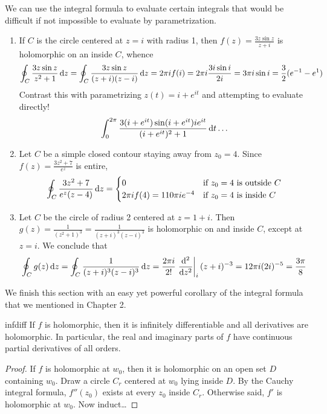 \begin{examples}{}{}
We can use the integral formula to evaluate certain integrals that would be difficult if not impossible to evaluate by parametrization.
\begin{enumerate}
  \item If $C$ is the circle centered at $z=i$ with radius 1, then $f(z)=\frac{3z\sin z}{z+i}$ is holomorphic on an inside $C$, whence
  \[\oint_C\frac{3z\sin z}{z^2+1}\,\dz =\oint_C\frac{3z\sin z}{(z+i)(z-i)}\,\dz =2\pi if(i)=2\pi i\frac{3i\sin i}{2i}=3\pi i\sin i =\frac 32(e^{-1}-e^1)\]
  Contrast this with parametrizing $z(t)=i+e^{it}$ and attempting to evaluate directly!
  \[\int_0^{2\pi}\frac{3(i+e^{it})\sin(i+e^{it})ie^{it}}{(i+e^{it})^2+1}\,\dt\ldots\]
  
  \item Let $C$ be a simple closed contour staying away from $z_0=4$. Since $f(z)=\frac{3z^2+7}{e^z}$ is entire,
  \[\oint_C\frac{3z^2+7}{e^z(z-4)}\,\dz=\begin{cases}
  0&\text{if $z_0=4$ is outside $C$}\\
  2\pi if(4)=110\pi ie^{-4}&\text{if $z_0=4$ is inside $C$}
  \end{cases}\]
  
  \item Let $C$ be the circle of radius 2 centered at $z=1+i$. Then $g(z)=\frac 1{(z^2+1)^3}=\frac 1{(z+i)^3(z-i)^3}$ is holomorphic on and inside $C$, except at $z=i$. We conclude that
  \[\oint_Cg(z)\,\dz=\oint_C\frac 1{(z+i)^3(z-i)^3}\,\dz=\frac{2\pi i}{2!}\diffat[^2]{z^2}{i}(z+i)^{-3} =12\pi i(2i)^{-5} =\frac{3\pi}{8}\]
\end{enumerate}
\end{examples}

We finish this section with an easy yet powerful corollary of the integral formula that we mentioned in Chapter 2.

\begin{cor}{}{infdiff}
If $f$ is holomorphic, then it is infinitely differentiable and all derivatives are holomorphic. In particular, the real and imaginary parts of $f$ have continuous partial derivatives of all orders.
\end{cor}


\begin{proof}
If $f$ is holomorphic at $w_0$, then it is holomorphic on an open set $D$ containing $w_0$. Draw a circle $C_r$ centered at $w_0$ lying inside $D$. By the Cauchy integral formula, $f''(z_0)$ exists at every $z_0$ inside $C_r$. Otherwise said, $f'$ is holomorphic at $w_0$. Now induct\ldots
\end{proof}

